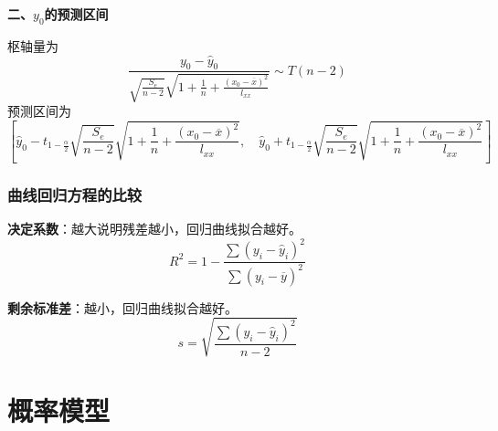 \documentclass[lang = cn, scheme = chinese, thmcnt = section]{elegantbook}
\begin{document}
\textbf{二、$y_0$的预测区间}

枢轴量为
$$
\frac{y_0-\hat{y}_0}{\sqrt{\frac{S_e}{n-2}}\sqrt{1+\frac{1}{n}+\frac{(x_0-\overline{x})^2}{l_{xx}}}}\sim T(n-2)
$$
预测区间为
$$
\left[
\hat{y}_0-t_{1-\frac{\alpha}{2}}\sqrt{\frac{S_e}{n-2}}\sqrt{1+\frac{1}{n}+\frac{(x_0-\overline{x})^2}{l_{xx}}},\quad 
\hat{y}_0+t_{1-\frac{\alpha}{2}}\sqrt{\frac{S_e}{n-2}}\sqrt{1+\frac{1}{n}+\frac{(x_0-\overline{x})^2}{l_{xx}}}
\right]
$$

\subsection{曲线回归方程的比较}

\textbf{决定系数}：越大说明残差越小，回归曲线拟合越好。
$$
R^2=1-\frac{\sum(y_i-\hat{y}_i)^2}{\sum(y_i-\overline{y})^2}
$$

\textbf{剩余标准差}：越小，回归曲线拟合越好。
$$
s=\sqrt{\frac{\sum(y_i-\hat{y}_i)^2}{n-2}}
$$

\appendix

\chapter{概率模型}
\end{document}
